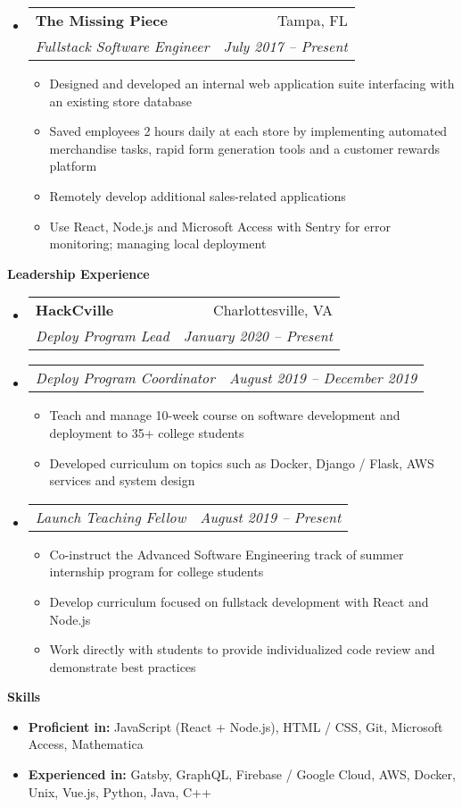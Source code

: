 \documentclass[letterpaper,12pt]{article}[leftmargin=*]
\makeatletter
\def \entryspacing {-0pt}
\renewcommand{\section}[2]{\vspace{5pt}
  \colorbox{secondary}{\color{white}\raggedbottom\normalsize\textbf{{#1}{\hspace{7pt}#2}}}
}
\newcommand{\resumeEntryStart}{\begin{itemize}[leftmargin=2.5mm]}
\newcommand{\resumeEntryEnd}{\end{itemize}\vspace{\entryspacing}}
\newcommand{\resumeItemListStart}{\begin{itemize}[leftmargin=4.5mm]}
\newcommand{\resumeItemListEnd}{\end{itemize}}
\newcommand{\resumeItem}[1]{
  \item\small{
    {#1 \vspace{-2pt}}
  }
}
\newcommand{\resumeEntryTSDL}[4]{
  \vspace{-1pt}\item[]
    \begin{tabular*}{0.97\textwidth}{l@{\extracolsep{\fill}}r}
      \textbf{\color{primary}#1} & {\firabook\color{accent}\small#2} \\
      \textit{\color{accent}\small#3} & \textit{\color{accent}\small#4} \\
    \end{tabular*}\vspace{-7pt}
}
\newcommand{\resumeEntrySD}[2]{
  \vspace{-1pt}\item[]
    \begin{tabular*}{0.97\textwidth}{l@{\extracolsep{\fill}}r}
      \textit{\color{accent}\small#1} & \textit{\color{accent}\small#2} \\
    \end{tabular*}\vspace{-6pt}
}
\newcommand{\resumeEntryS}[2]{
  \item[]\small{
    \textbf{\color{primary}#1} #2\vspace{-6pt}
  }
}
\makeatother
\begin{document}
  \resumeEntryStart
    \resumeEntryTSDL
      {The Missing Piece}{Tampa, FL}
      {Fullstack Software Engineer}{July 2017 -- Present}
    \resumeItemListStart
      \resumeItem {Designed and developed an internal web application suite interfacing with an existing store database}
      \resumeItem {Saved employees 2 hours daily at each store by implementing automated merchandise tasks, rapid form generation tools and a customer rewards platform}
      \resumeItem {Remotely develop additional sales-related applications}
      \resumeItem {Use React, Node.js and Microsoft Access with Sentry for error monitoring; managing local deployment}
    \resumeItemListEnd
  \resumeEntryEnd

\section{\faUsers}{Leadership Experience}

  \resumeEntryStart
    \resumeEntryTSDL
      {HackCville}{Charlottesville, VA}
      {Deploy Program Lead}{January 2020 -- Present}
    \resumeEntrySD
      {Deploy Program Coordinator}{August 2019 -- December 2019}
    \resumeItemListStart
      \resumeItem {Teach and manage 10-week course on software development and deployment to 35+ college students}
      \resumeItem {Developed curriculum on topics such as Docker, Django / Flask, AWS services and system design}
    \resumeItemListEnd
    \resumeEntrySD
      {Launch Teaching Fellow}{August 2019 -- Present}
    \resumeItemListStart
      \resumeItem {Co-instruct the Advanced Software Engineering track of summer internship program for college students}
      \resumeItem{Develop curriculum focused on fullstack development with React and Node.js}
      \resumeItem {Work directly with students to provide individualized code review and demonstrate best practices}
    \resumeItemListEnd
  \resumeEntryEnd

\section{\faGears}{Skills}
 \resumeEntryStart
  \resumeEntryS{Proficient in:} {JavaScript (React + Node.js), HTML / CSS, Git, Microsoft Access, Mathematica}
  \resumeEntryS{Experienced in:} {Gatsby, GraphQL, Firebase / Google Cloud, AWS, Docker, Unix, Vue.js, Python, Java, C++}
 \resumeEntryEnd
\end{document}
